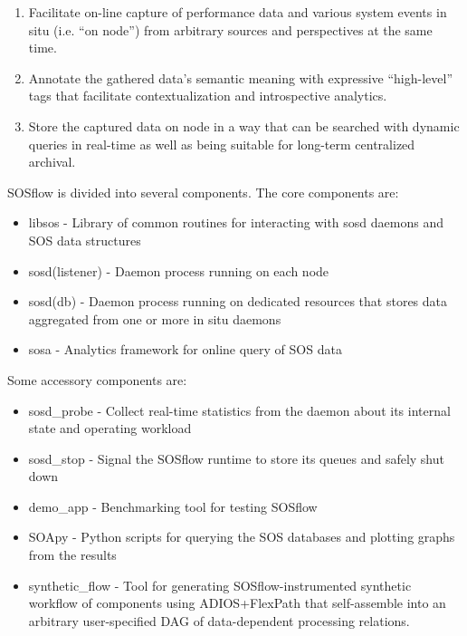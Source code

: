\begin{enumerate}
\item Facilitate on-line capture of performance data and various system
  events in situ (i.e. ``on node'') from arbitrary sources and
  perspectives at the same time.
\item Annotate the gathered data's semantic meaning with expressive
  ``high-level'' tags that facilitate contextualization and
  introspective analytics.
\item Store the captured data on node in a way that can be searched
  with dynamic queries in real-time as well as being suitable for
  long-term centralized archival.
\end{enumerate}

SOSflow is divided into several components.  The core components are:
\begin{itemize}
\item libsos - Library of common routines for interacting with
      sosd daemons and SOS data structures
\item sosd(listener) - Daemon process running on each node
\item sosd(db) - Daemon process running on dedicated resources
      that stores data aggregated from one or more in situ daemons
\item sosa - Analytics framework for online query of SOS data
\end{itemize}

Some accessory components are:
\begin{itemize}
\item sosd\_probe - Collect real-time statistics from the daemon about
      its internal state and operating workload
\item sosd\_stop - Signal the SOSflow runtime to store its queues and
      safely shut down
\item demo\_app - Benchmarking tool for testing SOSflow
\item SOApy - Python scripts for querying the SOS databases and plotting
      graphs from the results
\item synthetic\_flow - Tool for generating SOSflow-instrumented
      synthetic workflow of components using ADIOS+FlexPath
      that self-assemble into an arbitrary  user-specified DAG of
      data-dependent processing relations.
\end{itemize}

